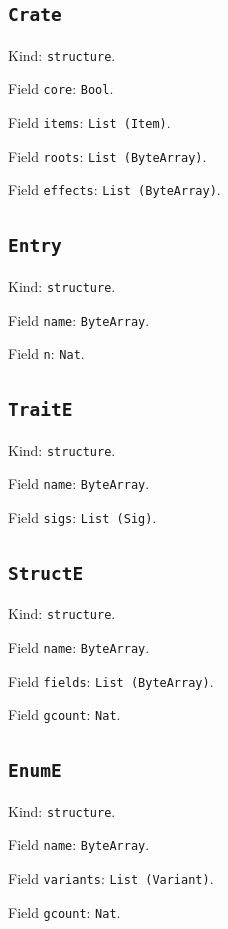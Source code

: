 \documentclass[11pt]{article}
\begin{document}
\subsection*{\texttt{Crate}}
\noindent Kind: \texttt{structure}.\par
\noindent Field \texttt{core}: \texttt{Bool}.\par
\noindent Field \texttt{items}: \texttt{List (Item)}.\par
\noindent Field \texttt{roots}: \texttt{List (ByteArray)}.\par
\noindent Field \texttt{effects}: \texttt{List (ByteArray)}.\par
\subsection*{\texttt{Entry}}
\noindent Kind: \texttt{structure}.\par
\noindent Field \texttt{name}: \texttt{ByteArray}.\par
\noindent Field \texttt{n}: \texttt{Nat}.\par
\subsection*{\texttt{TraitE}}
\noindent Kind: \texttt{structure}.\par
\noindent Field \texttt{name}: \texttt{ByteArray}.\par
\noindent Field \texttt{sigs}: \texttt{List (Sig)}.\par
\subsection*{\texttt{StructE}}
\noindent Kind: \texttt{structure}.\par
\noindent Field \texttt{name}: \texttt{ByteArray}.\par
\noindent Field \texttt{fields}: \texttt{List (ByteArray)}.\par
\noindent Field \texttt{gcount}: \texttt{Nat}.\par
\subsection*{\texttt{EnumE}}
\noindent Kind: \texttt{structure}.\par
\noindent Field \texttt{name}: \texttt{ByteArray}.\par
\noindent Field \texttt{variants}: \texttt{List (Variant)}.\par
\noindent Field \texttt{gcount}: \texttt{Nat}.\par
\end{document}
